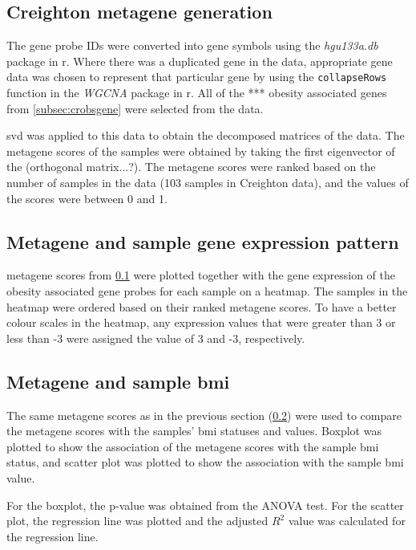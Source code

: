 \subsection{Creighton metagene generation}
\label{subsec:crmetagen}

The gene probe IDs were converted into gene symbols using the \textit{hgu133a.db} package in \gls{r}.
Where there was a duplicated gene in the data, appropriate gene data was chosen to represent that particular gene by using the \texttt{collapseRows} function in the \textit{WGCNA} package in \gls{r}.
All of the *** obesity associated genes from  \cref{subsec:crobsgene} were selected from the data.

\gls{svd} was applied to this data to obtain the decomposed matrices of the data.
The \gls{metagene} scores of the samples were obtained by taking the first eigenvector of the (orthogonal matrix...?).
The \gls{metagene} scores were ranked based on the number of samples in the data (103 samples in Creighton data), and the values of the scores were between 0 and 1.

\subsection{Metagene and sample gene expression pattern}
\label{subsec:crmetage}

\Gls{metagene} scores from \cref{subsec:crmetagen} were plotted together with the gene expression of the obesity associated gene probes for each sample on a heatmap.
The samples in the heatmap were ordered based on their ranked \gls{metagene} scores.
To have a better colour scales in the heatmap, any expression values that were greater than 3 or less than -3 were assigned the value of 3 and -3, respectively.

\subsection{Metagene and sample \gls{bmi}}
\label{subsec:crmetabmi}

The same \gls{metagene} scores as in the previous section (\cref{subsec:crmetage}) were used to compare the \gls{metagene} scores with the samples' \gls{bmi} statuses and values.
Boxplot was plotted to show the association of the \gls{metagene} scores with the sample \gls{bmi} status, and scatter plot was plotted to show the association with the sample \gls{bmi} value.

For the boxplot, the p-value was obtained from the ANOVA test.
For the scatter plot, the regression line was plotted and the adjusted $R^2$ value was calculated for the regression line.


